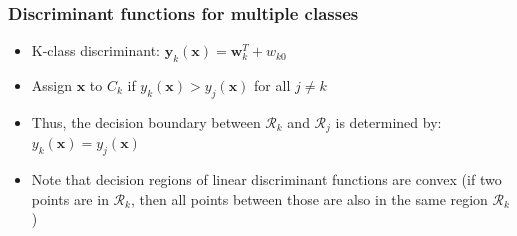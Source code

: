 \subsubsection{Discriminant functions for multiple classes}
\begin{itemize}
	\item K-class discriminant: $\bm{y}_k (\bm{x}) = \bm{w}_k^T + w_{k0}$
	\item Assign $\bm{x}$ to $C_k$ if $y_k(\bm{x})>y_j(\bm{x})$ for all $j\neq k$
	\item Thus, the decision boundary between $\mathcal{R}_k$ and $\mathcal{R}_j$ is determined by: $y_k(\bm{x})=y_j(\bm{x})$
	\item Note that decision regions of linear discriminant functions are convex (if two points are in $\mathcal{R}_k$, then all points between those are also in the same region $\mathcal{R}_k$)
\end{itemize}
